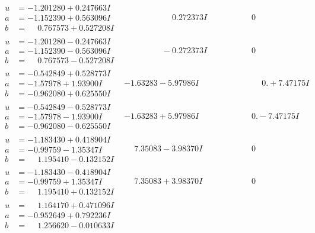 \documentclass[1p]{elsarticle_modified}
\theoremstyle{definition}
\begin{document}
$$\begin{array}{c|c|c}
\begin{aligned}
u &= -1.201280 + 0.247663 I \\
a &= -1.152390 + 0.563096 I \\
b &= \phantom{-}0.767573 + 0.527208 I\end{aligned}
 & \phantom{-0.000000 -}0.272373 I & \phantom{-0.000000 } 0 \\ \hline\begin{aligned}
u &= -1.201280 - 0.247663 I \\
a &= -1.152390 - 0.563096 I \\
b &= \phantom{-}0.767573 - 0.527208 I\end{aligned}
 & \phantom{-0.000000 } -0.272373 I & \phantom{-0.000000 } 0 \\ \hline\begin{aligned}
u &= -0.542849 + 0.528773 I \\
a &= -1.57978 + 1.93900 I \\
b &= -0.962080 + 0.625550 I\end{aligned}
 & -1.63283 - 5.97986 I & \phantom{-0.000000 -}0. + 7.47175 I \\ \hline\begin{aligned}
u &= -0.542849 - 0.528773 I \\
a &= -1.57978 - 1.93900 I \\
b &= -0.962080 - 0.625550 I\end{aligned}
 & -1.63283 + 5.97986 I & \phantom{-0.000000 } 0. - 7.47175 I \\ \hline\begin{aligned}
u &= -1.183430 + 0.418904 I \\
a &= -0.99759 - 1.35347 I \\
b &= \phantom{-}1.195410 - 0.132152 I\end{aligned}
 & \phantom{-}7.35083 - 3.98370 I & \phantom{-0.000000 } 0 \\ \hline\begin{aligned}
u &= -1.183430 - 0.418904 I \\
a &= -0.99759 + 1.35347 I \\
b &= \phantom{-}1.195410 + 0.132152 I\end{aligned}
 & \phantom{-}7.35083 + 3.98370 I & \phantom{-0.000000 } 0 \\ \hline\begin{aligned}
u &= \phantom{-}1.164170 + 0.471096 I \\
a &= -0.952649 + 0.792236 I \\
b &= \phantom{-}1.256620 - 0.010633 I\end{aligned}

\end{array}$$
\end{document}
